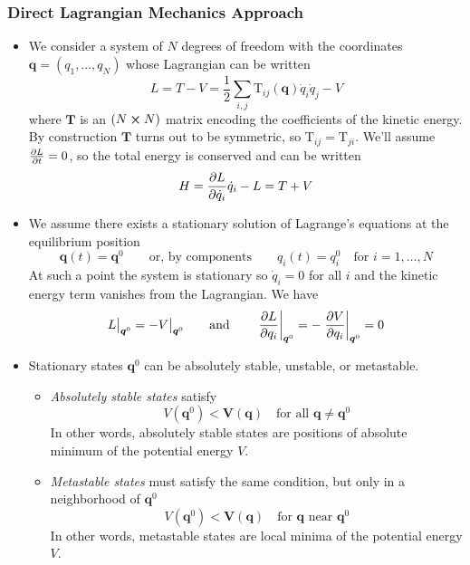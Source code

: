 \documentclass[11pt, a4paper]{article}
\newcommand{\eqtext}[1]{\qquad \text{#1} \qquad}
\newcommand{\mat}[1]{\mathbf{#1}} %
\begin{document}
\subsubsection{Direct Lagrangian Mechanics Approach}
\begin{itemize}
	\item We consider a system of $ N $ degrees of freedom with the coordinates $ \bm{q} = (q_{1}, \ldots, q_{N}) $ whose Lagrangian can be written
	\begin{equation*}
		L = T - V = \frac{1}{2} \sum_{i,j}\mathrm{T}_{ij}(\bm{q})\dot{q}_{i}\dot{q}_{j} - V
	\end{equation*}
	where $ \mat{T} $ is an $ (N \cross N) $ matrix encoding the coefficients of the kinetic energy. By construction $ \mat{T} $ turns out to be symmetric, so $ \mathrm{T}_{ij} = \mathrm{T}_{ji} $. We'll assume $ \pdv{L}{t} = 0$, so the total energy is conserved and can be written
	\begin{equation*}
		H = \pdv{L}{\dot{q}_{i}} \dot{q}_{i} - L = T + V
	\end{equation*}
	
	\item We assume there exists a stationary solution of Lagrange's equations at the equilibrium position 
	\begin{equation*}
		\bm{q}(t) = \bm{q}^{0} \eqtext{or, by components} q_{i}(t) = q_{i}^{0} \quad \text{for } i = 1, \ldots, N
	\end{equation*}
	At such a point the system is stationary so $ \dot{q}_{i} = 0 $ for all $ i $ and the kinetic energy term vanishes from the Lagrangian. We have
	\begin{equation*}
		L \big |_{\bm{q}^{0}} = - V \big |_{\bm{q}^{0}} \eqtext{and} \eval{\pdv{L}{q_{i}}}_{\bm{q}^{0}} =  - \eval{\pdv{V}{q_{i}}}_{\bm{q}^{0}} = 0
	\end{equation*}

	\item Stationary states $ \bm{q}^{0} $ can be absolutely stable, unstable, or metastable. 
	\begin{itemize}
		\item \textit{Absolutely stable states} satisfy
			\begin{equation*}
				V(\bm{q}^{0}) < \bm{V}(\bm{q}) \quad \text{for all } \bm{q} \neq \bm{q}^{0}
			\end{equation*}
			In other words, absolutely stable states are positions of absolute minimum of the potential energy $ V $. 
			
		\item \textit{Metastable states} must satisfy the same condition, but only in a neighborhood of $ \bm{q}^{0} $
		\begin{equation*}
			V(\bm{q}^{0}) < \bm{V}(\bm{q}) \quad \text{for } \bm{q} \text{ near } \bm{q}^{0}
		\end{equation*}
		In other words, metastable states are local minima of the potential energy $ V $. 
		

\end{itemize}
\end{itemize}
\end{document}
